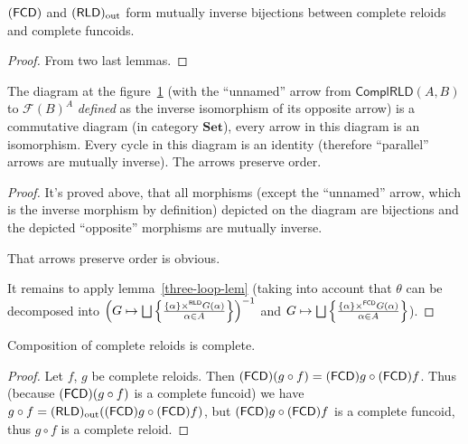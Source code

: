 \begin{prop}
$(\mathsf{FCD})$ and $(\mathsf{RLD})_{\mathrm{out}}$ form mutually inverse bijections between
complete reloids and complete funcoids.\end{prop}
\begin{proof}
From two last lemmas.\end{proof}
\begin{thm}\label{cmpl-dia-thm}
The diagram at the figure~\ref{cmpl-dia} (with the ``unnamed''
arrow from $\mathsf{ComplRLD}(A,B)$ to $\mathscr{F}(B)^A$ \emph{defined} as the inverse isomorphism of its opposite arrow)
is a commutative diagram (in category $\mathbf{Set}$), every arrow
in this diagram is an isomorphism. Every cycle in this diagram is
an identity (therefore ``parallel'' arrows are mutually inverse).
The arrows preserve order.

\begin{figure}[ht]
\caption{\label{cmpl-dia}}
\end{figure}
\end{thm}
\begin{proof}
It's proved above, that all morphisms (except the ``unnamed'' arrow,
which is the inverse morphism by definition) depicted on the diagram
are bijections and the depicted ``opposite'' morphisms are mutually
inverse.

That arrows preserve order is obvious.

It remains to apply lemma~\ref{three-loop-lem} (taking into account
that $\theta$ can be decomposed into $\left(G\mapsto\bigsqcup\setcond{\{\alpha\}\times^{\mathsf{RLD}}G(\alpha)}{\alpha\in A}\right)^{-1}$
and $G\mapsto\bigsqcup\setcond{\{\alpha\}\times^{\mathsf{FCD}}G(\alpha)}{\alpha\in A}$).\end{proof}
\begin{thm}
Composition of complete reloids is complete.\end{thm}
\begin{proof}
Let $f$, $g$ be complete reloids. Then $(\mathsf{FCD})(g\circ f)=(\mathsf{FCD}) g\circ(\mathsf{FCD}) f$.
Thus (because $(\mathsf{FCD})(g\circ f)$ is a complete funcoid) we have $g\circ f=(\mathsf{RLD})_{\mathrm{out}}((\mathsf{FCD}) g\circ(\mathsf{FCD}) f)$,
but $(\mathsf{FCD}) g\circ(\mathsf{FCD}) f$ is a complete funcoid, thus $g\circ f$
is a complete reloid.\end{proof}
